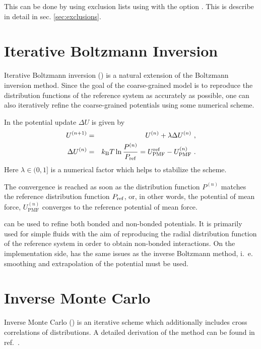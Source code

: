 This can be done by using exclusion lists using  with the option . This is describe in detail in sec. \ref{sec:exclusions}.


\section{Iterative Boltzmann Inversion}
\label{sec:ibi}

Iterative Boltzmann inversion (\ibi) is a natural extension of the Boltzmann inversion method. Since the goal of the coarse-grained model is to reproduce the distribution functions of the reference system as accurately as possible, one can also iteratively refine the coarse-grained potentials using some numerical scheme.

In \ibi the potential update $\Delta U$ is given by~\cite{Reith:2003}
\begin{eqnarray}
  \label{eq:iter_boltzmann}
  U^{(n+1)} &=& U^{(n)} + \lambda \Delta U^{(n)}~, \\
  \Delta U^{(n)} &=&  k_\text{B} T \ln  \frac{P^{(n)}}{P_{\rm ref}}
  =  U_\text{PMF}^\text{ref} - U_\text{PMF}^{(n)}~.
\end{eqnarray}
Here $\lambda \in (0,1]$ is a numerical factor which helps to stabilize the scheme.

The convergence is reached as soon as the distribution function $P^{(n)}$ matches the reference distribution function $P_{\rm ref}$, or, in other words, the potential of mean force, $U_\text{PMF}^{(n)}$ converges to the reference potential of mean force.

\ibi can be used to refine both bonded and non-bonded potentials. It is primarily used for simple fluids with the aim of reproducing the radial distribution function of the reference system in order to obtain non-bonded interactions. On the implementation side, \ibi has the same issues as the inverse Boltzmann method, i.~e. smoothing and extrapolation of the potential must be used.


\section{Inverse Monte Carlo}
\label{sec:imc}

Inverse Monte Carlo (\imc) is an iterative scheme which additionally includes cross correlations of distributions. A detailed derivation of the \imc method can be found in ref.~\cite{Lyubartsev:1995}.

